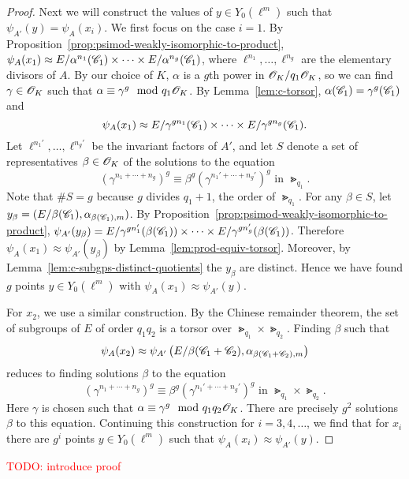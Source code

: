 \documentclass{amsart}
\begin{document}
\begin{proof}
    Next we will construct the values of $y \in Y_0(\ell^m)$ such that $\psi_{A'}(y) = \psi_{A}(x_i)$. We first focus on the case $i = 1$. By Proposition~\ref{prop:psimod-weakly-isomorphic-to-product}, $\psi_{A}(x_1) \approx E/\alpha^{n_1}(\mathscr{C}_1) \times \cdots \times E/\alpha^{n_g}(\mathscr{C}_1)$, where $\ell^{n_1},\dots,\ell^{n_g}$ are the elementary divisors of $A$. By our choice of $K$, $\alpha$ is a $g$th power in $\mathscr{O}_K/q_1\mathscr{O}_K$, so we can find $\gamma \in \mathscr{O}_K$ such that $\alpha \equiv \gamma^g \mod{q_1\mathscr{O}_K}$. By Lemma~\ref{lem:c-torsor}, $\alpha(\mathscr{C}_1) = \gamma^g(\mathscr{C}_1)$ and
    \[
      \psi_{A}(x_1) \approx E/\gamma^{gn_1}(\mathscr{C}_1) \times \cdots \times E/\gamma^{gn_g}(\mathscr{C}_1).
    \]
    Let $\ell^{n_1'},\dots,\ell^{n_g'}$ be the invariant factors of $A'$, and let $S$ denote a set of representatives $\beta \in \mathscr{O}_K$ of the solutions to the equation
    \[
      \left(\gamma^{n_1 + \cdots + n_g}\right)^g \equiv \beta^g\left(\gamma^{n_1' + \cdots + n_g'}\right)^g
      \text{ in } \Gt_{q_1}.
    \]
    Note that $\#S = g$ because $g$ divides $q_1 + 1$, the order of $\Gt_{q_1}$. For any $\beta \in S$, let $y_\beta = (E/\beta(\mathscr{C}_1),\alpha_{\beta(\mathscr{C}_1),m})$. By Proposition~\ref{prop:psimod-weakly-isomorphic-to-product}, $\psi_{A'}(y_\beta) = E/\gamma^{gn_1'}(\beta(\mathscr{C}_1)) \times \cdots \times E/\gamma^{gn_g'}(\beta(\mathscr{C}_1))$. Therefore $\psi_A(x_1) \approx \psi_{A'}(y_\beta)$ by Lemma~\ref{lem:prod-equiv-torsor}. Moreover, by Lemma~\ref{lem:c-subgps-distinct-quotients} the $y_\beta$ are distinct. Hence we have found $g$ points $y \in Y_0(\ell^m)$ with $\psi_{A}(x_1) \approx \psi_{A'}(y)$.

  For $x_2$, we use a similar construction. By the Chinese remainder theorem, the set of subgroups of $E$ of order $q_1q_2$ is a torsor over $\Gt_{q_1} \times \Gt_{q_2}$. Finding $\beta$ such that
  \[
    \psi_{A}(x_2) \approx \psi_{A'}\left(E/\beta(\mathscr{C}_1+\mathscr{C}_2),\alpha_{\beta(\mathscr{C}_1+\mathscr{C}_2),m}\right)
  \]
  reduces to finding solutions $\beta$ to the equation
  \[
    \left(\gamma^{n_1 + \cdots + n_g}\right)^g \equiv \beta^g\left(\gamma^{n_1' + \cdots + n_g'}\right)^g
    \text{ in } \Gt_{q_1} \times \Gt_{q_2}.
  \]
  Here $\gamma$ is chosen such that $\alpha \equiv \gamma^g \mod{q_1q_2\mathscr{O}_K}$. There are precisely $g^2$ solutions $\beta$ to this equation. Continuing this construction for $i=3,4,\dots$, we find that for $x_i$ there are $g^i$ points $y \in Y_0(\ell^m)$ such that $\psi_{A}(x_i) \approx \psi_{A'}(y)$.
\end{proof}

\textcolor{red}{TODO: introduce proof}
\end{document}
